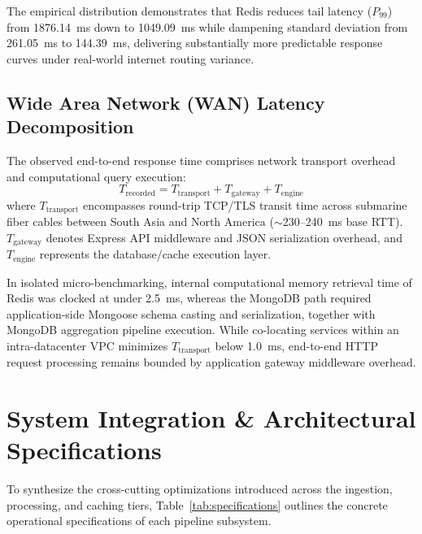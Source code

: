 \documentclass[conference]{IEEEtran}
\begin{document}
The empirical distribution demonstrates that Redis reduces tail latency ($P_{99}$) from 1876.14~ms down to 1049.09~ms while dampening standard deviation from 261.05~ms to 144.39~ms, delivering substantially more predictable response curves under real-world internet routing variance.

\subsection{Wide Area Network (WAN) Latency Decomposition}
The observed end-to-end response time comprises network transport overhead and computational query execution:
\begin{equation}
T_{\text{recorded}} = T_{\text{transport}} + T_{\text{gateway}} + T_{\text{engine}}
\label{eq:latency_decomp}
\end{equation}
where $T_{\text{transport}}$ encompasses round-trip TCP/TLS transit time across submarine fiber cables between South Asia and North America ($\sim$230--240~ms base RTT). $T_{\text{gateway}}$ denotes Express API middleware and JSON serialization overhead, and $T_{\text{engine}}$ represents the database/cache execution layer.

In isolated micro-benchmarking, internal computational memory retrieval time of Redis was clocked at under 2.5~ms, whereas the MongoDB path required application-side Mongoose schema casting and serialization, together with MongoDB aggregation pipeline execution. While co-locating services within an intra-datacenter VPC minimizes $T_{\text{transport}}$ below 1.0~ms, end-to-end HTTP request processing remains bounded by application gateway middleware overhead.

\section{System Integration \& Architectural Specifications}
To synthesize the cross-cutting optimizations introduced across the ingestion, processing, and caching tiers, Table~\ref{tab:specifications} outlines the concrete operational specifications of each pipeline subsystem.
\end{document}
